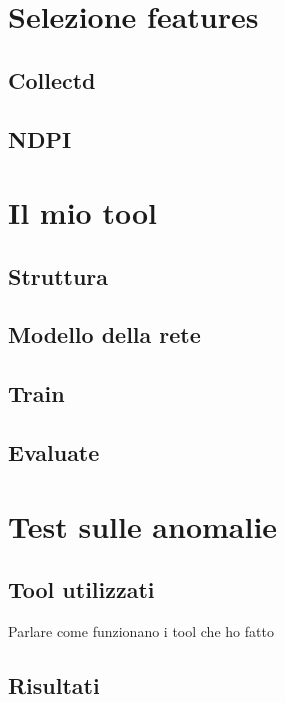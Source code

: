 \section{Selezione features}
\subsection{Collectd}
\subsection{NDPI}

\section{Il mio tool}
\subsection{Struttura}
\subsection{Modello della rete}
\subsection{Train}
\subsection{Evaluate}


\section{Test sulle anomalie}
\subsection{Tool utilizzati}

Parlare come funzionano i tool che ho fatto

\subsection{Risultati}

